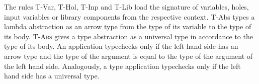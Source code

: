 \begin{prooftree}
\end{prooftree}

\begin{prooftree}
\end{prooftree}

\begin{prooftree}
\end{prooftree}

\begin{prooftree}
\end{prooftree}

\begin{prooftree}
\end{prooftree}

\begin{prooftree}
\end{prooftree}

\begin{prooftree}
\end{prooftree}

The rules T-Var, T-Hol, T-Inp and T-Lib load the signature of variables, holes, input variables or library components from the respective context.
T-Abs types a lambda abstraction as an arrow type from the type of its variable to the type of its body. \textsc{T-Abs} gives a type abstraction as a universal type in accordance to the type of its body.
An application typechecks only if the left hand side has an arrow type and the type of the argument is equal to the type of the argument of the left hand side. Analogously, a type application typechecks only if the left hand side has a universal type.


